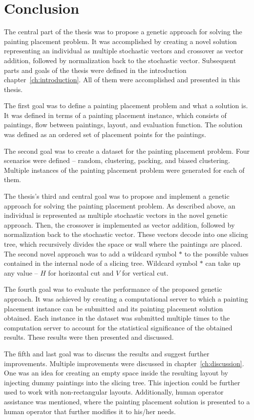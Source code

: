 \chapter{Conclusion}\label{ch:conclusion}

The central part of the thesis was to propose a genetic approach for solving the painting placement problem.
It was accomplished by creating a novel solution representing an individual as multiple stochastic vectors
and crossover as vector addition, followed by normalization back to the stochastic vector.
Subsequent parts and goals of the thesis were defined in the introduction chapter~\ref{ch:introduction}.
All of them were accomplished and presented in this thesis.

The first goal was to define a painting placement problem and what a solution is.
It was defined in terms of a painting placement instance, which consists
of paintings, flow between paintings, layout, and evaluation function.
The solution was defined as an ordered set of placement points for the paintings.

The second goal was to create a dataset for the painting placement problem.
Four scenarios were defined – random, clustering, packing, and biased clustering.
Multiple instances of the painting placement problem were generated for each of them.

The thesis's third and central goal was to propose and implement a genetic approach for solving the painting placement problem.
As described above, an individual is represented as multiple stochastic vectors in the novel genetic approach.
Then, the crossover is implemented as vector addition, followed by normalization back to the stochastic vector.
These vectors decode into one slicing tree, which recursively divides the space or wall where the paintings are placed.
The second novel approach was to add a wildcard symbol $*$ to the possible values contained in the internal node of a slicing tree.
Wildcard symbol $*$ can take up any value – $H$ for horizontal cut and $V$ for vertical cut.

The fourth goal was to evaluate the performance of the proposed genetic approach.
It was achieved by creating a computational server to which a painting placement
instance can be submitted and its painting placement solution obtained.
Each instance in the dataset was submitted multiple times to the computation server to account for the statistical significance of the obtained results.
These results were then presented and discussed.

The fifth and last goal was to discuss the results and suggest further improvements.
Multiple improvements were discussed in chapter~\ref{ch:discussion}.
One was an idea for creating an empty space inside the resulting layout by injecting dummy paintings into the slicing tree.
This injection could be further used to work with non-rectangular layouts.
Additionally, human operator assistance was mentioned, where the painting placement solution is presented to a human operator
that further modifies it to his/her needs.


